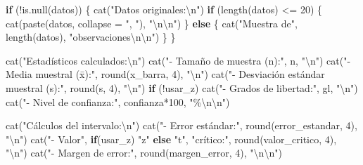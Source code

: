 \documentclass[
  spanish,
  letterpaper,
]{book}
\newenvironment{Shaded}{\begin{snugshade}}{\end{snugshade}}
\newcommand{\AttributeTok}[1]{\textcolor[rgb]{0.40,0.45,0.13}{#1}}
\newcommand{\ControlFlowTok}[1]{\textcolor[rgb]{0.00,0.23,0.31}{\textbf{#1}}}
\newcommand{\DecValTok}[1]{\textcolor[rgb]{0.68,0.00,0.00}{#1}}
\newcommand{\FunctionTok}[1]{\textcolor[rgb]{0.28,0.35,0.67}{#1}}
\newcommand{\NormalTok}[1]{\textcolor[rgb]{0.00,0.23,0.31}{#1}}
\newcommand{\SpecialCharTok}[1]{\textcolor[rgb]{0.37,0.37,0.37}{#1}}
\newcommand{\StringTok}[1]{\textcolor[rgb]{0.13,0.47,0.30}{#1}}
\begin{document}
\begin{Shaded}
\begin{Highlighting}[]
  \ControlFlowTok{if}\NormalTok{ (}\SpecialCharTok{!}\FunctionTok{is.null}\NormalTok{(datos)) \{}
    \FunctionTok{cat}\NormalTok{(}\StringTok{"Datos originales:}\SpecialCharTok{\textbackslash{}n}\StringTok{"}\NormalTok{)}
    \ControlFlowTok{if}\NormalTok{ (}\FunctionTok{length}\NormalTok{(datos) }\SpecialCharTok{\textless{}=} \DecValTok{20}\NormalTok{) \{}
      \FunctionTok{cat}\NormalTok{(}\FunctionTok{paste}\NormalTok{(datos, }\AttributeTok{collapse =} \StringTok{", "}\NormalTok{), }\StringTok{"}\SpecialCharTok{\textbackslash{}n\textbackslash{}n}\StringTok{"}\NormalTok{)}
\NormalTok{    \} }\ControlFlowTok{else}\NormalTok{ \{}
      \FunctionTok{cat}\NormalTok{(}\StringTok{"Muestra de"}\NormalTok{, }\FunctionTok{length}\NormalTok{(datos), }\StringTok{"observaciones}\SpecialCharTok{\textbackslash{}n\textbackslash{}n}\StringTok{"}\NormalTok{)}
\NormalTok{    \}}
\NormalTok{  \}}
  
  \FunctionTok{cat}\NormalTok{(}\StringTok{"Estadísticos calculados:}\SpecialCharTok{\textbackslash{}n}\StringTok{"}\NormalTok{)}
  \FunctionTok{cat}\NormalTok{(}\StringTok{"{-} Tamaño de muestra (n):"}\NormalTok{, n, }\StringTok{"}\SpecialCharTok{\textbackslash{}n}\StringTok{"}\NormalTok{)}
  \FunctionTok{cat}\NormalTok{(}\StringTok{"{-} Media muestral (x̄):"}\NormalTok{, }\FunctionTok{round}\NormalTok{(x\_barra, }\DecValTok{4}\NormalTok{), }\StringTok{"}\SpecialCharTok{\textbackslash{}n}\StringTok{"}\NormalTok{)}
  \FunctionTok{cat}\NormalTok{(}\StringTok{"{-} Desviación estándar muestral (s):"}\NormalTok{, }\FunctionTok{round}\NormalTok{(s, }\DecValTok{4}\NormalTok{), }\StringTok{"}\SpecialCharTok{\textbackslash{}n}\StringTok{"}\NormalTok{)}
  \ControlFlowTok{if}\NormalTok{ (}\SpecialCharTok{!}\NormalTok{usar\_z) }\FunctionTok{cat}\NormalTok{(}\StringTok{"{-} Grados de libertad:"}\NormalTok{, gl, }\StringTok{"}\SpecialCharTok{\textbackslash{}n}\StringTok{"}\NormalTok{)}
  \FunctionTok{cat}\NormalTok{(}\StringTok{"{-} Nivel de confianza:"}\NormalTok{, confianza}\SpecialCharTok{*}\DecValTok{100}\NormalTok{, }\StringTok{"\%}\SpecialCharTok{\textbackslash{}n\textbackslash{}n}\StringTok{"}\NormalTok{)}
  
  \FunctionTok{cat}\NormalTok{(}\StringTok{"Cálculos del intervalo:}\SpecialCharTok{\textbackslash{}n}\StringTok{"}\NormalTok{)}
  \FunctionTok{cat}\NormalTok{(}\StringTok{"{-} Error estándar:"}\NormalTok{, }\FunctionTok{round}\NormalTok{(error\_estandar, }\DecValTok{4}\NormalTok{), }\StringTok{"}\SpecialCharTok{\textbackslash{}n}\StringTok{"}\NormalTok{)}
  \FunctionTok{cat}\NormalTok{(}\StringTok{"{-} Valor"}\NormalTok{, }\ControlFlowTok{if}\NormalTok{(usar\_z) }\StringTok{"z"} \ControlFlowTok{else} \StringTok{"t"}\NormalTok{, }\StringTok{"crítico:"}\NormalTok{, }\FunctionTok{round}\NormalTok{(valor\_critico, }\DecValTok{4}\NormalTok{), }\StringTok{"}\SpecialCharTok{\textbackslash{}n}\StringTok{"}\NormalTok{)}
  \FunctionTok{cat}\NormalTok{(}\StringTok{"{-} Margen de error:"}\NormalTok{, }\FunctionTok{round}\NormalTok{(margen\_error, }\DecValTok{4}\NormalTok{), }\StringTok{"}\SpecialCharTok{\textbackslash{}n\textbackslash{}n}\StringTok{"}\NormalTok{)}
  

\end{Highlighting}
\end{Shaded}
\end{document}
